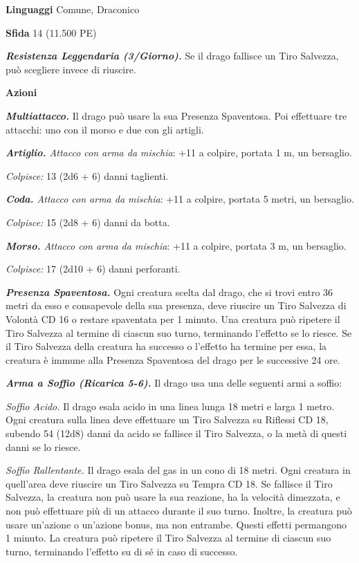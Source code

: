\begin{multicols}{2}
\textbf{Linguaggi} Comune, Draconico

\textbf{Sfida} 14 (11.500 PE)

\emph{\textbf{Resistenza Leggendaria (3/Giorno).}} Se il drago fallisce un Tiro Salvezza, può scegliere invece di riuscire.

\textbf{Azioni}

\emph{\textbf{Multiattacco.}} Il drago può usare la sua Presenza Spaventosa. Poi effettuare tre attacchi: uno con il morso e due con gli artigli.

\emph{\textbf{Artiglio.} Attacco con arma da mischia}: +11 a colpire, portata 1 m, un bersaglio.

\emph{Colpisce:} 13 (2d6 + 6) danni taglienti.

\emph{\textbf{Coda.} Attacco con arma da mischia}: +11 a colpire, portata 5 metri, un bersaglio.

\emph{Colpisce:} 15 (2d8 + 6) danni da botta.

\emph{\textbf{Morso.} Attacco con arma da mischia}: +11 a colpire, portata 3 m, un bersaglio.

\emph{Colpisce:} 17 (2d10 + 6) danni perforanti.

\emph{\textbf{Presenza Spaventosa.}} Ogni creatura scelta dal drago, che si trovi entro 36 metri da esso e consapevole della sua presenza, deve riuscire un Tiro Salvezza di Volontà CD 16 o restare spaventata per 1 minuto. Una creatura può ripetere il Tiro Salvezza al termine di ciascun suo turno, terminando l'effetto se lo riesce. Se il Tiro Salvezza della creatura ha successo o l'effetto ha termine per essa, la creatura è immune alla Presenza Spaventosa del drago per le successive 24 ore.

\emph{\textbf{Arma a Soffio (Ricarica 5-6).}} Il drago usa una delle seguenti armi a soffio:

\emph{Soffio Acido.} Il drago esala acido in una linea lunga 18 metri e larga 1 metro. Ogni creatura sulla linea deve effettuare un Tiro Salvezza su Riflessi CD 18, subendo 54 (12d8) danni da acido se fallisce il Tiro Salvezza, o la metà di questi danni se lo riesce.

\emph{Soffio Rallentante.} Il drago esala del gas in un cono di 18 metri. Ogni creatura in quell'area deve riuscire un Tiro Salvezza su Tempra CD 18. Se fallisce il Tiro Salvezza, la creatura non può usare la sua reazione, ha la velocità dimezzata, e non può effettuare più di un attacco durante il suo turno. Inoltre, la creatura può usare un'azione o un'azione bonus, ma non entrambe. Questi effetti permangono 1 minuto. La creatura può ripetere il Tiro Salvezza al termine di ciascun suo turno, terminando l'effetto su di sé in caso di successo.


\end{multicols}

